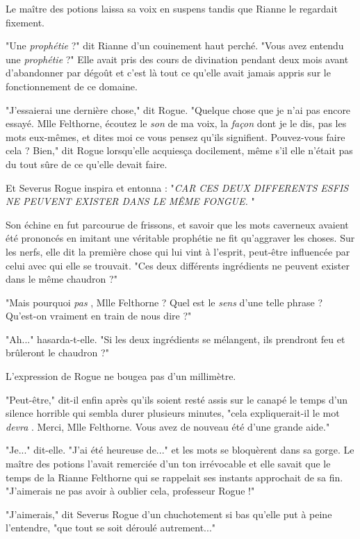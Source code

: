 Le maître des potions laissa sa voix en suspens tandis que Rianne le regardait fixement.

"Une \emph{prophétie}  ?" dit Rianne d'un couinement haut perché. "Vous avez entendu une \emph{prophétie}  ?" Elle avait pris des cours de divination pendant deux mois avant d'abandonner par dégoût et c'est là tout ce qu'elle avait jamais appris sur le fonctionnement de ce domaine.

"J'essaierai une dernière chose," dit Rogue. "Quelque chose que je n'ai pas encore essayé. Mlle Felthorne, écoutez le \emph{son}  de ma voix, la \emph{façon}  dont je le dis, pas les mots eux-mêmes, et dites moi ce vous pensez qu'ils signifient. Pouvez-vous faire cela ? Bien," dit Rogue lorsqu'elle acquiesça docilement, même s'il elle n'était pas du tout sûre de ce qu'elle devait faire.

Et Severus Rogue inspira et entonna : "\emph{CAR CES DEUX DIFFERENTS ESFIS NE PEUVENT EXISTER DANS LE MÊME FONGUE.} "

Son échine en fut parcourue de frissons, et savoir que les mots caverneux avaient été prononcés en imitant une véritable prophétie ne fit qu'aggraver les choses. Sur les nerfs, elle dit la première chose qui lui vint à l'esprit, peut-être influencée par celui avec qui elle se trouvait. "Ces deux différents ingrédients ne peuvent exister dans le même chaudron ?"

"Mais pourquoi \emph{pas} , Mlle Felthorne ? Quel est le \emph{sens}  d'une telle phrase ? Qu'est-on vraiment en train de nous dire ?"

"Ah..." hasarda-t-elle. "Si les deux ingrédients se mélangent, ils prendront feu et brûleront le chaudron ?"

L'expression de Rogue ne bougea pas d'un millimètre.

"Peut-être," dit-il enfin après qu'ils soient resté assis sur le canapé le temps d'un silence horrible qui sembla durer plusieurs minutes, "cela expliquerait-il le mot \emph{devra} . Merci, Mlle Felthorne. Vous avez de nouveau été d'une grande aide."

"Je..." dit-elle. "J'ai été heureuse de..." et les mots se bloquèrent dans sa gorge. Le maître des potions l'avait remerciée d'un ton irrévocable et elle savait que le temps de la Rianne Felthorne qui se rappelait ses instants approchait de sa fin. "J'aimerais ne pas avoir à oublier cela, professeur Rogue !"

"J'aimerais," dit Severus Rogue d'un chuchotement si bas qu'elle put à peine l'entendre, "que tout se soit déroulé autrement..."

